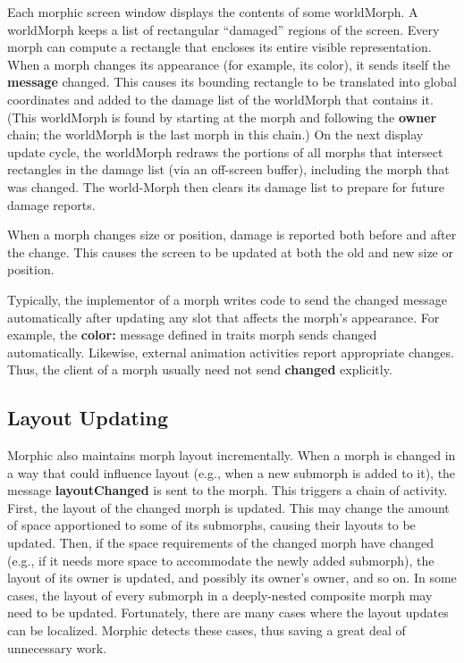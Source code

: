 \documentclass[letterpaper,10pt,english]{sphinxmanual}
\begin{document}
Each morphic screen window displays the contents of some worldMorph. A worldMorph keeps a list of rectangular ``damaged'' regions of the screen. Every morph can compute a rectangle that encloses its entire visible representation. When a morph changes its appearance (for example, its color), it sends itself the \textbf{message} changed. This causes its bounding rectangle to be translated into global coordinates and added to the damage list of the worldMorph that contains it. (This worldMorph is found by starting at the morph and following the \textbf{owner} chain; the worldMorph is the last morph in this chain.) On the next display update cycle, the worldMorph redraws the portions of all morphs that intersect rectangles in the damage list (via an off-screen buffer), including the morph that was changed. The world-Morph then clears its damage list to prepare for future damage reports.

When a morph changes size or position, damage is reported both before and after the change. This causes the screen to be updated at both the old and new size or position.

Typically, the implementor of a morph writes code to send the changed message automatically after updating any slot that affects the morph's appearance. For example, the \textbf{color:} message defined in traits morph sends changed automatically. Likewise, external animation activities report appropriate changes. Thus, the client of a morph usually need not send \textbf{changed} explicitly.


\subsection{Layout Updating}
\label{morphic:layout-updating}
Morphic also maintains morph layout incrementally. When a morph is changed in a way that could influence layout (e.g., when a new submorph is added to it), the message \textbf{layoutChanged} is sent to the morph. This triggers a chain of activity. First, the layout of the changed morph is updated. This may change the amount of space apportioned to some of its submorphs, causing their layouts to be updated. Then, if the space requirements of the changed morph have changed (e.g., if it needs more space to accommodate the newly added submorph), the layout of its owner is updated, and possibly its owner's owner, and so on. In some cases, the layout of every submorph in a deeply-nested composite morph may need to be updated. Fortunately, there are many cases where the layout updates can be localized. Morphic detects these cases, thus saving a great deal of unnecessary work.
\end{document}
